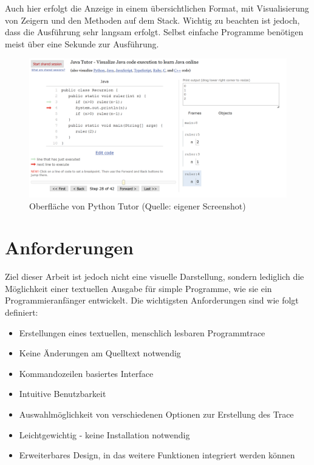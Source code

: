 Auch hier erfolgt die Anzeige in einem übersichtlichen Format, mit Visualisierung von Zeigern und den Methoden auf dem Stack. Wichtig zu beachten ist jedoch, dass die Ausführung sehr langsam erfolgt. Selbst einfache Programme benötigen meist über eine Sekunde zur Ausführung.

\begin{figure}[h]
	\includegraphics[width=\textwidth]{analyse/bilder/pythonTutor.png}
	\caption{Oberfläche von Python Tutor (Quelle: eigener Screenshot)}
\end{figure}

\section{Anforderungen} 
\label{sec:anforderungen}

Ziel dieser Arbeit ist jedoch nicht eine visuelle Darstellung, sondern lediglich die Möglichkeit einer textuellen Ausgabe für simple Programme, wie sie ein Programmieranfänger entwickelt. Die wichtigsten Anforderungen sind wie folgt definiert:

\begin{itemize}
	\item Erstellungen eines textuellen, menschlich lesbaren Programmtrace
	\item Keine Änderungen am Quelltext notwendig
	\item Kommandozeilen basiertes Interface
	\item Intuitive Benutzbarkeit
	\item Auswahlmöglichkeit von verschiedenen Optionen zur Erstellung des Trace
	\item Leichtgewichtig - keine Installation notwendig
	\item Erweiterbares Design, in das weitere Funktionen integriert werden können
\end{itemize}

